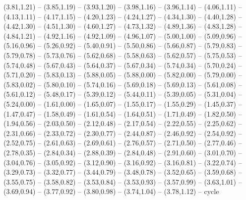 \expandafter\def\csname geo:gebiet:heute-ITA\endcsname{
  (3.81,1.21) -- (3.85,1.19) -- (3.93,1.20) -- (3.98,1.16) -- (3.96,1.14) -- (4.06,1.11) -- (4.13,1.11) -- (4.17,1.15) -- (4.20,1.23) -- (4.24,1.27) -- (4.34,1.30) -- (4.40,1.28) -- (4.42,1.30) -- (4.51,1.30) -- (4.60,1.27) -- (4.73,1.32) -- (4.89,1.36) -- (4.83,1.28) -- (4.84,1.21) -- (4.92,1.16) -- (4.92,1.09) -- (4.96,1.07) -- (5.00,1.00) -- (5.09,0.96) -- (5.16,0.96) -- (5.26,0.92) -- (5.40,0.91) -- (5.50,0.86) -- (5.66,0.87) -- (5.79,0.83) -- (5.79,0.78) -- (5.73,0.76) -- (5.62,0.68) -- (5.58,0.63) -- (5.62,0.57) -- (5.75,0.53) -- (5.74,0.48) -- (5.67,0.43) -- (5.64,0.37) -- (5.67,0.34) -- (5.74,0.34) -- (5.70,0.24) -- (5.71,0.20) -- (5.83,0.13) -- (5.88,0.05) -- (5.88,0.00) -- (5.82,0.00) -- (5.79,0.00) -- (5.83,0.02) -- (5.80,0.10) -- (5.74,0.16) -- (5.69,0.18) -- (5.69,0.13) -- (5.61,0.08) -- (5.61,0.12) -- (5.48,0.17) -- (5.39,0.12) -- (5.44,0.11) -- (5.39,0.05) -- (5.31,0.04) -- (5.24,0.00) -- (1.61,0.00) -- (1.65,0.07) -- (1.55,0.17) -- (1.55,0.29) -- (1.45,0.37) -- (1.47,0.47) -- (1.58,0.49) -- (1.61,0.54) -- (1.64,0.51) -- (1.71,0.49) -- (1.82,0.50) -- (1.94,0.56) -- (2.03,0.50) -- (2.12,0.48) -- (2.17,0.54) -- (2.22,0.55) -- (2.25,0.62) -- (2.31,0.66) -- (2.33,0.72) -- (2.30,0.77) -- (2.44,0.87) -- (2.46,0.92) -- (2.54,0.92) -- (2.52,0.75) -- (2.61,0.63) -- (2.69,0.61) -- (2.76,0.57) -- (2.71,0.50) -- (2.77,0.46) -- (2.78,0.35) -- (2.84,0.34) -- (2.88,0.39) -- (2.84,0.48) -- (2.91,0.60) -- (3.01,0.70) -- (3.04,0.76) -- (3.05,0.92) -- (3.12,0.90) -- (3.16,0.92) -- (3.16,0.81) -- (3.22,0.74) -- (3.29,0.73) -- (3.32,0.77) -- (3.44,0.79) -- (3.48,0.78) -- (3.52,0.65) -- (3.59,0.68) -- (3.55,0.75) -- (3.58,0.82) -- (3.53,0.84) -- (3.53,0.93) -- (3.57,0.99) -- (3.63,1.01) -- (3.69,0.94) -- (3.77,0.92) -- (3.80,0.98) -- (3.74,1.04) -- (3.78,1.12) -- cycle}
